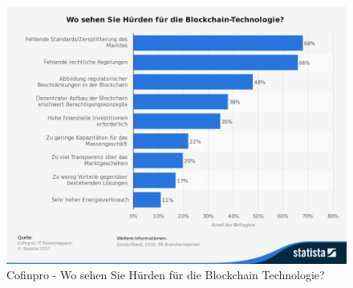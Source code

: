 \begin{figure}[h!]
	\centering
	\includegraphics[width=0.7\linewidth]{pictures/Statista-Huerden-Blockchain-2016}
	\caption[Statista Blockchain Umfrage]{Cofinpro - Wo sehen Sie Hürden für die Blockchain Technologie? \cite{Cofinpro}}
	\label{fig:statista-huerden-blockchain-2016}
\end{figure}






\newpage
